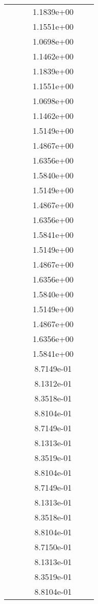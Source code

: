 \begin{xltabular}{\textwidth}{r|rS[table-format=1.3e+2]S[table-format=1.4e+2]S[table-format=1.4e+2]S[table-format=-1.5]}
&  &  & 1.1839e+00 & & \\
&  &  & 1.1551e+00 & & \\
&  &  & 1.0698e+00 & & \\
&  &  & 1.1462e+00 & & \\
&  &  & 1.1839e+00 & & \\
&  &  & 1.1551e+00 & & \\
&  &  & 1.0698e+00 & & \\
&  &  & 1.1462e+00 & & \\
&  &  & 1.5149e+00 & & \\
&  &  & 1.4867e+00 & & \\
&  &  & 1.6356e+00 & & \\
&  &  & 1.5840e+00 & & \\
&  &  & 1.5149e+00 & & \\
&  &  & 1.4867e+00 & & \\
&  &  & 1.6356e+00 & & \\
&  &  & 1.5841e+00 & & \\
&  &  & 1.5149e+00 & & \\
&  &  & 1.4867e+00 & & \\
&  &  & 1.6356e+00 & & \\
&  &  & 1.5840e+00 & & \\
&  &  & 1.5149e+00 & & \\
&  &  & 1.4867e+00 & & \\
&  &  & 1.6356e+00 & & \\
&  &  & 1.5841e+00 & & \\
&  &  & 8.7149e-01 & & \\
&  &  & 8.1312e-01 & & \\
&  &  & 8.3518e-01 & & \\
&  &  & 8.8104e-01 & & \\
&  &  & 8.7149e-01 & & \\
&  &  & 8.1313e-01 & & \\
&  &  & 8.3519e-01 & & \\
&  &  & 8.8104e-01 & & \\
&  &  & 8.7149e-01 & & \\
&  &  & 8.1313e-01 & & \\
&  &  & 8.3518e-01 & & \\
&  &  & 8.8104e-01 & & \\
&  &  & 8.7150e-01 & & \\
&  &  & 8.1313e-01 & & \\
&  &  & 8.3519e-01 & & \\
&  &  & 8.8104e-01 & & \\

\end{xltabular}
